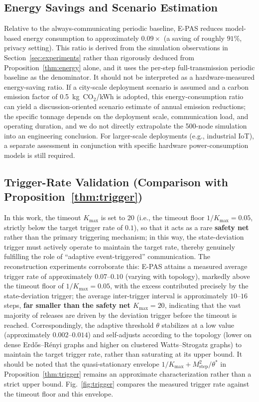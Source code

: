 \documentclass[10pt]{article}
\newcommand{\EPAS}{E-PAS}
\newcommand{\Mstep}{M_{\text{step}}}
\begin{document}
\subsection{Energy Savings and Scenario Estimation}\label{sec:energy_savings}

Relative to the always-communicating periodic baseline, \EPAS{} reduces model-based energy consumption to approximately $0.09\times$ (a saving of roughly $91\%$, privacy setting). This ratio is derived from the simulation observations in Section~\ref{sec:experiments} rather than rigorously deduced from Proposition~\ref{thm:energy} alone, and it uses the per-step full-transmission periodic baseline as the denominator. It should not be interpreted as a hardware-measured energy-saving ratio. If a city-scale deployment scenario is assumed and a carbon emission factor of 0.5~kg~CO$_2$/kWh is adopted, this energy-consumption ratio can yield a discussion-oriented scenario estimate of annual emission reductions; the specific tonnage depends on the deployment scale, communication load, and operating duration, and we do not directly extrapolate the 500-node simulation into an engineering conclusion. For larger-scale deployments (e.g., industrial IoT), a separate assessment in conjunction with specific hardware power-consumption models is still required.

\subsection{Trigger-Rate Validation (Comparison with Proposition~\ref{thm:trigger})}\label{sec:trigger_validation}

In this work, the timeout $K_{\max}$ is set to $20$ (i.e., the timeout floor $1/K_{\max}=0.05$, strictly below the target trigger rate of $0.1$), so that it acts as a rare \textbf{safety net} rather than the primary triggering mechanism; in this way, the state-deviation trigger must actively operate to maintain the target rate, thereby genuinely fulfilling the role of ``adaptive event-triggered'' communication. The reconstruction experiments corroborate this: \EPAS{} attains a measured average trigger rate of approximately $0.07$--$0.10$ (varying with topology), markedly above the timeout floor of $1/K_{\max}=0.05$, with the excess contributed precisely by the state-deviation trigger; the average inter-trigger interval is approximately $10$--$16$ steps, \textbf{far smaller than the safety net $K_{\max}=20$}, indicating that the vast majority of releases are driven by the deviation trigger before the timeout is reached. Correspondingly, the adaptive threshold $\theta$ stabilizes at a low value (approximately $0.002$--$0.014$) and self-adjusts according to the topology (lower on dense Erd\H{o}s--R\'enyi graphs and higher on clustered Watts--Strogatz graphs) to maintain the target trigger rate, rather than saturating at its upper bound. It should be noted that the quasi-stationary envelope $1/K_{\max}+\Mstep^2/\theta^*$ in Proposition~\ref{thm:trigger} remains an approximate characterization rather than a strict upper bound. Fig.~\ref{fig:trigger} compares the measured trigger rate against the timeout floor and this envelope.
\end{document}
